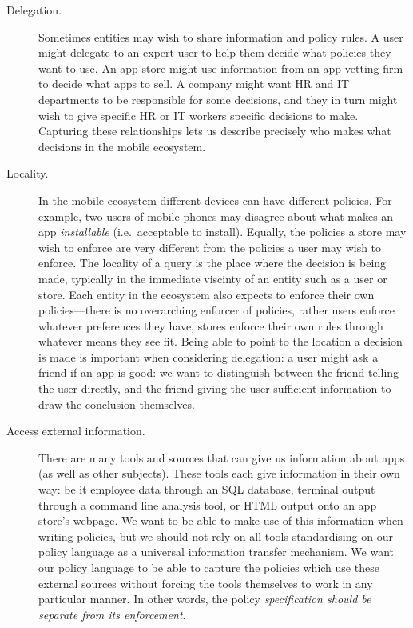 \documentclass[thesis.tex]{subfiles}
\begin{document}
\begin{description}
  \item[Delegation.] Sometimes entities may wish to
    share information and policy rules. A user might delegate to an
    expert user to help them decide what policies they want to use. An app
    store might use information from an app vetting firm to decide what
    apps to sell. A company might want HR and IT departments to be
    responsible for some decisions, and they in turn might wish to give
    specific HR or IT workers specific decisions to make. Capturing these
    relationships lets us describe precisely who makes what decisions in
    the mobile ecosystem.

  \item[Locality.] In the mobile ecosystem different devices can have different
    policies. For example, two users of mobile phones may disagree about what
    makes an app \emph{installable} (i{.}e{.}~acceptable to install). Equally,
    the policies a store may wish to enforce are very different from the policies
    a user may wish to enforce. The locality of a query is the place where the
    decision is being made, typically in the immediate viscinty of an entity such
    as a user or store. Each entity in the ecosystem also expects to enforce
    their own policies---there is no overarching enforcer of policies, rather
    users enforce whatever preferences they have, stores enforce their own rules
    through whatever means they see fit. Being able to point to the location a
    decision is made is important when considering delegation: a user might ask a
    friend if an app is good: we want to distinguish between the friend telling
    the user directly, and the friend giving the user sufficient information to
    draw the conclusion themselves.

  \item[Access external information.] There are many tools and sources
    that can give us information about apps (as well as other
    subjects). These tools each give information in their own way: be it
    employee data through an SQL database, terminal output through a
    command line analysis tool, or HTML output onto an app store's
    webpage. We want to be able to make use of this information when
    writing policies, but we should not rely on all tools standardising on
    our policy language as a universal information transfer mechanism. We
    want our policy language to be able to capture the policies which use
    these external sources without forcing the tools themselves to work in
    any particular manner. In other words, the policy \emph{specification
    should be separate from its enforcement}.


\end{description}
\end{document}
